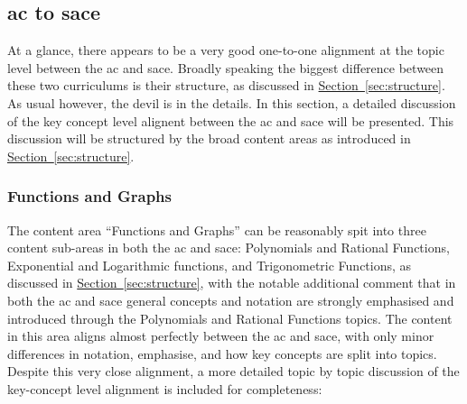 \documentclass[twoside,12pt,a4paper]{report}
\newcommand{\refsec}[1]{\hyperref[sec:#1]{Section~\ref{sec:#1}}}
\begin{document}
\subsection{\gls{ac} to \gls{sace}}

At a glance, there appears to be a very good one-to-one alignment at the topic level between the \gls{ac} and \gls{sace}. Broadly speaking the biggest difference between these two curriculums is their structure, as discussed in \refsec{structure}. As usual however, the devil is in the details. In this section, a detailed discussion of the key concept level alignent between the \gls{ac} and \gls{sace} will be presented. This discussion will be structured by the broad content areas as introduced in 
\refsec{structure}.

\subsubsection{Functions and Graphs}

The content area ``Functions and Graphs'' can be reasonably spit into three content sub-areas in both the \gls{ac} and \gls{sace}: Polynomials and Rational Functions, Exponential and Logarithmic functions, and Trigonometric Functions, as discussed in \refsec{structure}, with the notable additional comment that in both the \gls{ac} and \gls{sace} general concepts and notation are strongly emphasised and introduced through the Polynomials and Rational Functions topics. The content in this area aligns almost perfectly between the \gls{ac} and \gls{sace}, with only minor differences in notation, emphasise, and how key concepts are split into topics. Despite this very close alignment, a more detailed topic by topic discussion of the key-concept level alignment is included for completeness:
\end{document}
